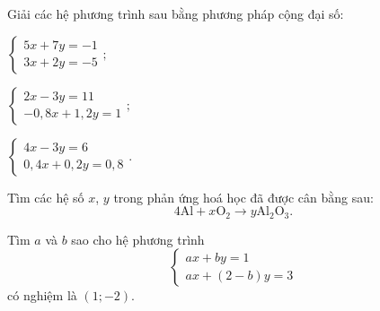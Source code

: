 \begin{exercises}
\begin{questions}[resume=SGK]
\begin{questions}
            \answerline
            \answerline
            \answerline
        \end{questions}

        \item Giải các hệ phương trình sau bằng phương pháp cộng đại số:
        \begin{questions}
            \item $\begin{cases}5x+7y=-1\\3x+2y=-5\end{cases};$

            \answerline
            \answerline
            \answerline

            \item $\begin{cases}2x-3y=11\\-0{,}8x+1{,}2y=1\end{cases};$

            \answerline
            \answerline
            \answerline

            \item $\begin{cases}4x-3y=6\\0{,}4x+0{,}2y=0{,}8\end{cases}.$

            \answerline
            \answerline
            \answerline
        \end{questions}

        \item Tìm các hệ số $x$, $y$ trong phản ứng hoá học đã được cân bằng sau:
        \[
            4\mathrm{Al}+x\mathrm{O}_2\rightarrow y\mathrm{Al}_2\mathrm{O}_3.
        \]

        \answerline
        \answerline

        \item Tìm $a$ và $b$ sao cho hệ phương trình
        \[
            \begin{cases}
                ax+by=1\\
                ax+(2-b)y=3
            \end{cases}
        \]
        có nghiệm là $(1;-2)$.

        \answerline
        \answerline
        \answerline
    \end{questions}
\end{exercises}
